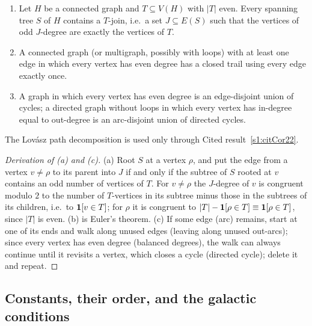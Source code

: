 \begin{citedresult}\label{s1:citEuler}
\begin{enumerate}
\item[(a)] Let $H$ be a connected graph and $T\subseteq V(H)$ with $|T|$ even.
Every spanning tree $S$ of $H$ contains a $T$-join, i.e.\ a set $J\subseteq E(S)$
such that the vertices of odd $J$-degree are exactly the vertices of $T$.
\item[(b)] A connected graph (or multigraph, possibly with loops) with at least one
edge in which every vertex has even degree has a closed trail using every edge
exactly once.
\item[(c)] A graph in which every vertex has even degree is an edge-disjoint union
of cycles; a directed graph without loops in which every vertex has in-degree
equal to out-degree is an arc-disjoint union of directed cycles.
\end{enumerate}
The Lov\'asz path decomposition is used only through Cited
result~\ref{s1:citCor22}.
\end{citedresult}
\begin{proof}[Derivation of (a) and (c)]
(a) Root $S$ at a vertex $\rho$, and put the edge from a vertex $v\ne\rho$ to its
parent into $J$ if and only if the subtree of $S$ rooted at $v$ contains an odd
number of vertices of $T$. For $v\ne\rho$ the $J$-degree of $v$ is congruent
modulo $2$ to the number of $T$-vertices in its subtree minus those in the
subtrees of its children, i.e.\ to $\mathbf{1}[v\in T]$; for $\rho$ it is congruent to
$|T|-\mathbf{1}[\rho\in T]\equiv\mathbf{1}[\rho\in T]$, since $|T|$ is even. (b) is Euler's
theorem. (c) If some edge (arc) remains, start at one of its ends and walk along
unused edges (leaving along unused out-arcs); since every vertex has even degree
(balanced degrees), the walk can always continue until it revisits a vertex,
which closes a cycle (directed cycle); delete it and repeat.
\end{proof}

\subsection{Constants, their order, and the galactic conditions}\label{s1:ssecConstants}

